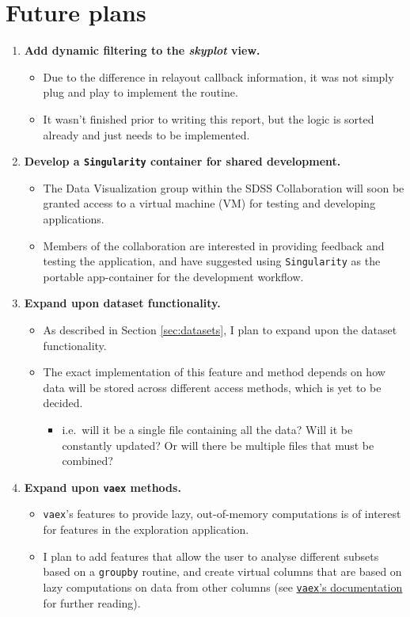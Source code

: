 \documentclass[a4paper,10pt,twocolumn]{article}
\begin{document}
\section{Future plans}
\begin{enumerate}
	\item \textbf{Add dynamic filtering to the \emph{skyplot} view.}
	      \begin{itemize}
		      \item Due to the difference in relayout callback information, it was not simply plug and play to implement the routine.
		      \item It wasn't finished prior to writing this report, but the logic is sorted already and just needs to be implemented.
	      \end{itemize}
	      \item\textbf{Develop a \texttt{Singularity} container for shared development.}
	      \begin{itemize}
		      \item The Data Visualization group within the SDSS Collaboration will soon be granted access to a virtual machine (VM) for testing and developing applications.
		      \item Members of the collaboration are interested in providing feedback and testing the application, and have suggested using \texttt{Singularity} \parencite{singularity} as the portable app-container for the development workflow.
	      \end{itemize}
	\item \textbf{Expand upon dataset functionality.}
	      \begin{itemize}
		      \item As described in Section \ref{sec:datasets}, I plan to expand upon the dataset functionality.
		      \item The exact implementation of this feature and method depends on how data will be stored across different access methods, which is yet to be decided.
		            \begin{itemize}
			            \item i.e.\ will it be a single file containing all the data? Will it be constantly updated? Or will there be multiple files that must be combined?
		            \end{itemize}
	      \end{itemize}
	\item \textbf{Expand upon \texttt{vaex} methods.}
	      \begin{itemize}
		      \item \texttt{vaex}'s features to provide lazy, out-of-memory computations is of interest for features in the exploration application.
		      \item I plan to add features that allow the user to analyse different subsets based on a \texttt{groupby} routine, and create virtual columns that are based on lazy computations on data from other columns (see \href{https://vaex.io/docs/tutorial.html#Virtual-columns}{\texttt{vaex}'s documentation} for further reading).
	      \end{itemize}
\end{enumerate}

\printbibliography
\end{document}
